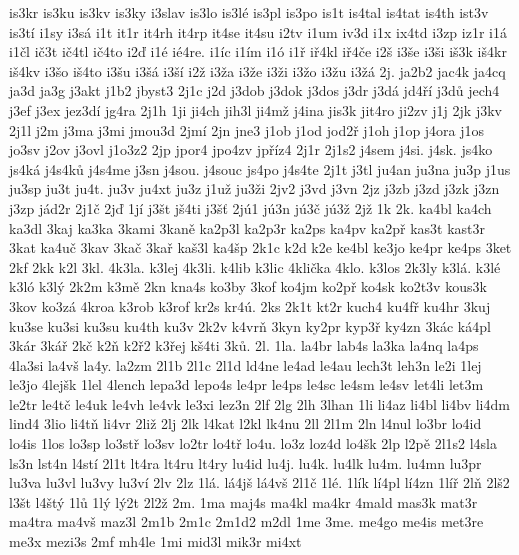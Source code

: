 {is3kr
is3ku
is3kv
is3ky
i3slav
is3lo
is3l\'e
is3pl
is3po
is1t
is4tal
is4tat
is4th
ist3v
is3t\'i
i1sy
i3s\'a
i1t
it1r
it4rh
it4rp
it4se
it4su
i2tv
i1um
iv3d
i1x
ix4td
i3zp
iz1r
i1\'a
i1\v cl
i\v c3t
i\v c4tl
i\v c4to
i2\v d
i1\'e
i\'e4re.
i1\'ic
i1\'im
i1\'o
i1\v r
i\v r4kl
i\v r4\v ce
i2\v s
i3\v se
i3\v si
i\v s3k
i\v s4kr
i\v s4kv
i3\v so
i\v s4to
i3\v su
i3\v s\'a
i3\v s\'i
i2\v z
i3\v za
i3\v ze
i3\v zi
i3\v zo
i3\v zu
i3\v z\'a
2j.
ja2b2
jac4k
ja4cq
ja3d
ja3g
j3akt
j1b2
jbyst3
2j1c
j2d
j3dob
j3dok
j3dos
j3dr
j3d\'a
jd4\v r\'i
j3d\r u
jech4
j3ef
j3ex
jez3d\'i
jg4ra
2j1h
1ji
ji4ch
jih3l
ji4m\v z
j4ina
jis3k
jit4ro
ji2zv
j1j
2jk
j3kv
2j1l
j2m
j3ma
j3mi
jmou3d
2jm\'i
2jn
jne3
j1ob
j1od
jod2\v r
j1oh
j1op
j4ora
j1os
jo3sv
j2ov
j3ovl
j1o3z2
2jp
jpor4
jpo4zv
jp\v r\'iz4
2j1r
2j1s2
j4sem
j4si.
j4sk.
js4ko
js4k\'a
j4s4k\r u
j4s4me
j3sn
j4sou.
j4souc
js4po
j4s4te
2j1t
j3tl
ju4an
ju3na
ju3p
j1us
ju3sp
ju3t
ju4t.
ju3v
ju4xt
ju3z
j1u\v z
ju3\v zi
2jv2
j3vd
j3vn
2jz
j3zb
j3zd
j3zk
j3zn
j3zp
j\'ad2r
2j1\v c
2j\v d
1j\'i
j3\v st
j\v s4ti
j3\v s\v t
2j\'u1
j\'u3n
j\'u3\v c
j\'u3\v z
2j\v z
1k
2k.
ka4bl
ka4ch
ka3dl
3kaj
ka3ka
3kami
3kan\v e
ka2p3l
ka2p3r
ka2ps
ka4pv
ka2p\v r
kas3t
kast3r
3kat
ka4u\v c
3kav
3ka\v c
3ka\v r
ka\v s3l
ka4\v sp
2k1c
k2d
k2e
ke4bl
ke3jo
ke4pr
ke4ps
3ket
2kf
2kk
k2l
3kl.
4k3la.
k3lej
4k3li.
k4lib
k3lic
4kli\v cka
4klo.
k3los
2k3ly
k3l\'a.
k3l\'e
k3l\'o
k3l\'y
2k2m
k3m\v e
2kn
kna4s
ko3by
3kof
ko4jm
ko2p\v r
ko4sk
ko2t3v
kous3k
3kov
ko3z\'a
4kroa
k3rob
k3rof
kr2s
kr4\'u.
2ks
2k1t
kt2r
kuch4
ku4f\v r
ku4hr
3kuj
ku3se
ku3si
ku3su
ku4th
ku3v
2k2v
k4vr\v n
3kyn
ky2pr
kyp3\v r
ky4zn
3k\'ac
k\'a4pl
3k\'ar
3k\'a\v r
2k\v c
k2\v n
k2\v r2
k3\v rej
k\v s4ti
3k\r u.
2l.
1la.
la4br
lab4s
la3ka
la4nq
la4ps
4la3si
la4v\v s
la4y.
la2zm
2l1b
2l1c
2l1d
ld4ne
le4ad
le4au
lech3t
leh3n
le2i
1lej
le3jo
4lej\v sk
1lel
4lench
lepa3d
lepo4s
le4pr
le4ps
le4sc
le4sm
le4sv
let4li
let3m
le2tr
le4t\v c
le4uk
le4vh
le4vk
le3xi
lez3n
2lf
2lg
2lh
3lhan
1li
li4az
li4bl
li4bv
li4dm
lind4
3lio
li4t\v n
li4vr
2li\v z
2lj
2lk
l4kat
l2kl
lk4nu
2ll
2l1m
2ln
l4nul
lo3br
lo4id
lo4is
1los
lo3sp
lo3st\v r
lo3sv
lo2tr
lo4t\v r
lo4u.
lo3z
loz4d
lo4\v sk
2lp
l2p\v e
2l1s2
l4sla
ls3n
lst4n
l4st\'i
2l1t
lt4ra
lt4ru
lt4ry
lu4id
lu4j.
lu4k.
lu4lk
lu4m.
lu4mn
lu3pr
lu3va
lu3vl
lu3vy
lu3v\'i
2lv
2lz
1l\'a.
l\'a4j\v s
l\'a4v\v s
2l1\v c
1l\'e.
1l\'ik
l\'i4pl
l\'i4zn
1l\'i\v r
2l\v n
2l\v s2
l3\v st
l4\v st\'y
1l\r u
1l\'y
l\'y2t
2l2\v z
2m.
1ma
maj4s
ma4kl
ma4kr
4mald
mas3k
mat3r
ma4tra
ma4v\v s
maz3l
2m1b
2m1c
2m1d2
m2dl
1me
3me.
me4go
me4is
met3re
me3x
mezi3s
2mf
mh4le
1mi
mid3l
mik3r
mi4xt
}
